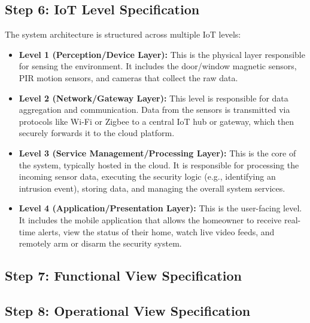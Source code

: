 \documentclass[conference]{IEEEtran}
\begin{document}
\subsection{Step 6: IoT Level Specification}
The system architecture is structured across multiple IoT levels:
\begin{itemize}
    \item \textbf{Level 1 (Perception/Device Layer):} This is the physical layer responsible for sensing the environment. It includes the door/window magnetic sensors, PIR motion sensors, and cameras that collect the raw data.

    \item \textbf{Level 2 (Network/Gateway Layer):} This level is responsible for data aggregation and communication. Data from the sensors is transmitted via protocols like Wi-Fi or Zigbee to a central IoT hub or gateway, which then securely forwards it to the cloud platform.

    \item \textbf{Level 3 (Service Management/Processing Layer):} This is the core of the system, typically hosted in the cloud. It is responsible for processing the incoming sensor data, executing the security logic (e.g., identifying an intrusion event), storing data, and managing the overall system services.

    \item \textbf{Level 4 (Application/Presentation Layer):} This is the user-facing level. It includes the mobile application that allows the homeowner to receive real-time alerts, view the status of their home, watch live video feeds, and remotely arm or disarm the security system.
\end{itemize}

\subsection{Step 7: Functional View Specification}

\cite{idkfactchecking2025}

\subsection{Step 8: Operational View Specification}
\end{document}
